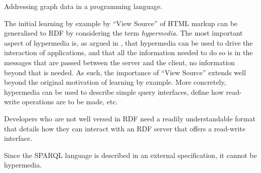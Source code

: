 \begin{problem}\label{prob:graph}
Addressing graph data in a programming language.
\end{problem}

The initial learning by example by ``View Source'' of HTML markup can
be generalised to RDF by considering the term \emph{hypermedia}. The
most important aspect of hypermedia is, as argued in
\cite{Fielding_2000_Architectural-Styles}, that hypermedia can be used
to drive the interaction of applications, and that all the information
needed to do so is in the messages that are passed between the server
and the client, no information beyond that is needed. As such, the
importance of ``View Source'' extends well beyond the original
motivation of learning by example. More concretely, hypermedia can be
used to describe simple query interfaces, define how read-write
operations are to be made, etc. %

\begin{problem}\label{prob:lapis}
Developers who are not well versed in RDF need a readily
understandable format that details how they can interact with an RDF
server that offers a read-write interface.
\end{problem}

\begin{problem}\label{prob:tpf}
Since the SPARQL language is described in an external specification,
it cannot be hypermedia.
\end{problem}


